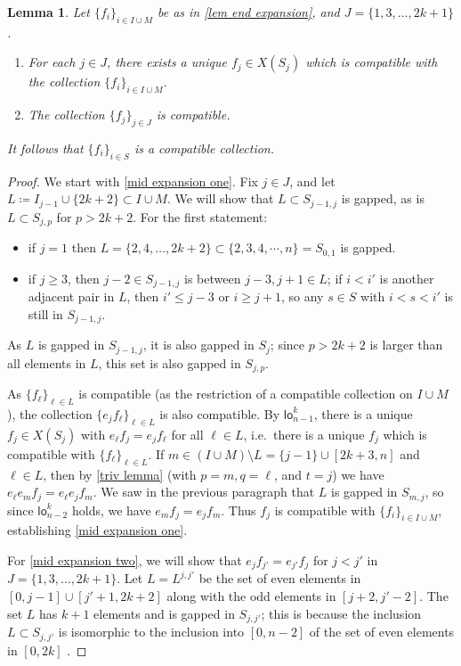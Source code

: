 \documentclass{amsart}
\newcommand{\lowod}{\mathsf{lo}}
\newtheorem{lemma}[theorem]{Lemma}
\theoremstyle{definition}
\theoremstyle{remark}
\begin{document}
\begin{lemma}\label{lem mid expansion}
Let $\{f_i\}_{i \in I \cup M}$ be as in \cref{lem end expansion}, and $J = \{1, 3, \dots, 2k+1\}$.
\begin{enumerate}
\item For each $j\in J$, there exists a unique $f_j \in X(S_j)$ which is compatible with the collection $\{f_i\}_{i \in I \cup M}$. \label{mid expansion one}
\item The collection $\{f_j \}_{j\in J}$ is compatible.\label{mid expansion two}
\end{enumerate}
It follows that $\{f_i\}_{i \in S}$ is a compatible collection. 
\end{lemma}
\begin{proof}
We start with \eqref{mid expansion one}. 
Fix $j\in J$, and let $L \coloneq I_{j-1} \cup \{2k+2\} \subset I \cup M$.
We will show that $L \subset S_{j-1,j}$ is gapped, as is $L \subset S_{j, p}$ for $p > 2k+2$.
For the first statement: 
\begin{itemize}[left=0pt]
\item if $j =1$ then $L = \{2, 4, \dots, 2k+2 \} \subset \{2, 3, 4, \cdots, n \} = S_{0,1}$ is gapped.
\item if $j \geq 3$, then $j-2 \in S_{j-1,j}$ is between $j-3, j+1 \in L$; if $i < i'$ is another adjacent pair in $L$, then $i' \leq j-3$ or $i \geq j+1$, so any $s \in S$ with $i < s < i'$ is still in $S_{j-1,j}$.
\end{itemize}
As $L$ is gapped in $S_{j-1,j}$, it is also gapped in $S_j$; since $p > 2k+2$ is larger than all elements in $L$, this set is also gapped in $S_{j,p}$.

As $\{f_\ell\}_{\ell \in L}$ is compatible (as the restriction of a compatible collection on $I\cup M$), the collection $\{e_j f_\ell \}_{\ell \in L}$ is also compatible.
By $\lowod_{n-1}^k$, there is a unique $f_j \in X(S_j)$ with $e_\ell f_j = e_j f_\ell$ for all $\ell \in L$, i.e.\ there is a unique $f_j$ which is compatible with $\{f_\ell\}_{\ell \in L}$.
If $m\in (I \cup M) \setminus L = \{j-1\} \cup [2k+3,n]$ and $\ell \in L$, then by \cref{triv lemma} (with  $p=m, q=\ell$, and $t=j$) we have $e_\ell e_m f_j = e_\ell e_j f_m$.
We saw in the previous paragraph that $L$ is gapped in $S_{m,j}$, so since $\lowod_{n-2}^k$ holds, we have $e_m f_j = e_j f_m$.
Thus $f_j$ is compatible with $\{f_i \}_{i\in I \cup M}$, establishing \eqref{mid expansion one}.

For \eqref{mid expansion two}, we will show that $e_j f_{j'} = e_{j'} f_j$ for $j < j'$ in $J = \{1, 3, \dots, 2k+1\}$.
Let $L=L^{j,j'}$ be the set of even elements in $[0,j-1] \cup [j'+1,2k+2]$ along with the odd elements in $[j+2,j'-2]$.
The set $L$ has $k+1$ elements and is gapped in $S_{j,j'}$; this is because the inclusion $L\subset S_{j,j'}$ is isomorphic to the inclusion into $[0,n-2]$ of the set of even elements in $[0,2k]$ .


\end{proof}
\end{document}
